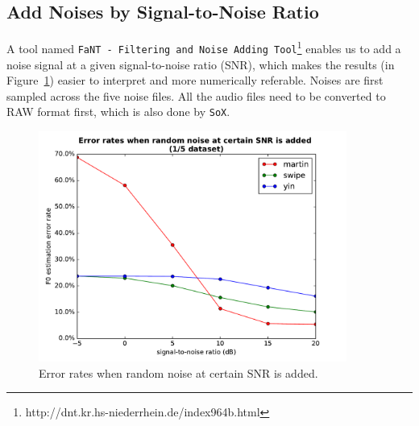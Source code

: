 \documentclass[11pt,a4paper,titlepage]{article}
\begin{document}
\newpage

\subsection{Add Noises by Signal-to-Noise Ratio}

A tool named \texttt{FaNT - Filtering and Noise Adding Tool}\footnote{http://dnt.kr.hs-niederrhein.de/index964b.html} enables us to add a noise signal at a given signal-to-noise ratio (SNR), which makes the results (in Figure~\ref{fig:snr}) easier to interpret and more numerically referable.
Noises are first sampled across the five noise files.
All the audio files need to be converted to RAW format first, which is also done by \texttt{SoX}.

\begin{figure}[htbp]
  \centering
  \includegraphics[width=0.9\textwidth]{error_rates_vs_snrs.pdf}
  \caption{Error rates when random noise at certain SNR is added.} \label{fig:snr}
\end{figure}
\end{document}
